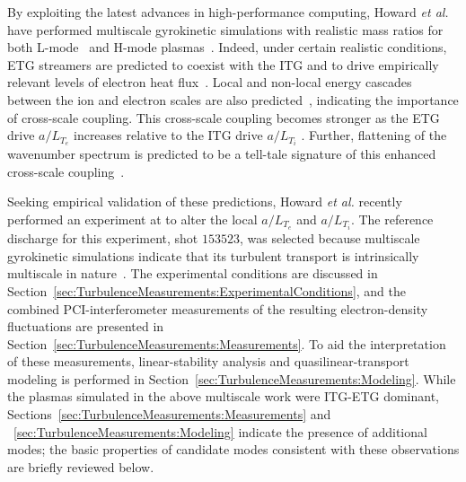By exploiting the latest advances in high-performance computing,
Howard \emph{et al.} have performed
multiscale gyrokinetic simulations
with realistic mass ratios
for both L-mode~\cite{howard_pp14, howard_nf16, howard_pp16} and
H-mode plasmas~\cite{howard_ppcf18, holland_nf17}.
Indeed, under certain realistic conditions,
ETG streamers are predicted
to coexist with the ITG and
to drive empirically relevant levels
of electron heat flux~\cite{howard_pp14}.
Local and non-local energy cascades
between the ion and electron scales
are also predicted~\cite{howard_nf16},
indicating the importance of cross-scale coupling.
This cross-scale coupling becomes stronger
as the ETG drive $a / L_{T_e}$ increases
relative to the ITG drive $a / L_{T_i}$
\cite{howard_pp16}.
Further, flattening of the wavenumber spectrum
is predicted to be a tell-tale signature
of this enhanced cross-scale coupling~\cite{howard_pp16}.

Seeking empirical validation of these predictions,
Howard \emph{et al.} recently performed an experiment at \diiid\space
to alter the local $a / L_{T_e}$ and $a / L_{T_i}$.
The reference discharge for this experiment,
\diiid\space shot $153523$,
was selected because multiscale gyrokinetic simulations
indicate that its turbulent transport
is intrinsically multiscale in nature~\cite{holland_nf17}.
The experimental conditions are discussed
in Section~\ref{sec:TurbulenceMeasurements:ExperimentalConditions}, and
the combined PCI-interferometer measurements
of the resulting electron-density fluctuations are presented
in Section~\ref{sec:TurbulenceMeasurements:Measurements}.
To aid the interpretation of these measurements,
linear-stability analysis and quasilinear-transport modeling
is performed in Section~\ref{sec:TurbulenceMeasurements:Modeling}.
While the plasmas simulated in the above multiscale work
were ITG-ETG dominant,
Sections~\ref{sec:TurbulenceMeasurements:Measurements} and
~\ref{sec:TurbulenceMeasurements:Modeling}
indicate the presence of additional modes;
the basic properties of candidate modes
consistent with these observations
are briefly reviewed below.

